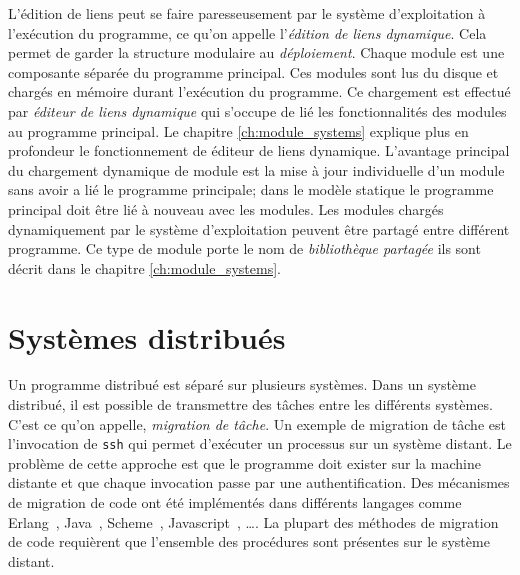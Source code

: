 L'édition de liens peut se faire paresseusement par le système d'exploitation à
l'exécution du programme, ce qu'on appelle l'\textit{édition de liens dynamique}.  Cela
permet de garder la structure modulaire au \textit{déploiement}.
Chaque module est une composante séparée du programme principal.  Ces modules
sont lus du disque et chargés en mémoire durant l'exécution du programme.  Ce
chargement est effectué par \textit{éditeur de liens dynamique} qui s'occupe de
lié les fonctionnalités des modules au programme principal. Le chapitre %
\ref{ch:module_systems} explique plus en profondeur le fonctionnement de éditeur de liens
dynamique. L'avantage principal du chargement dynamique de module est la mise à jour
individuelle d'un module sans avoir a lié le programme principale; dans le
modèle statique le programme principal doit être lié à nouveau avec les modules.
Les modules chargés dynamiquement par le système d'exploitation peuvent être partagé entre différent
programme. Ce type de module porte le nom de \textit{bibliothèque partagée} ils sont décrit dans
le chapitre \ref{ch:module_systems}.

\section{Systèmes distribués}


Un programme distribué est séparé sur plusieurs systèmes. Dans un système
distribué, il est possible de transmettre des tâches entre les différents
systèmes. C'est ce qu'on appelle, \textit{migration de tâche}.  Un exemple de
migration de tâche est l'invocation de \texttt{ssh} qui permet d'exécuter un
processus sur un système distant. Le problème de cette approche est que le
programme doit exister sur la machine distante et que chaque invocation passe
par une authentification. Des mécanismes de migration de code ont été
implémentés dans différents langages comme Erlang~\cite{M_mobileintelligent},
Java~\cite{And98transparentmigration}, Scheme~\cite{Sumii00animplementation},
Javascript~\cite{DEV2017transparentmigration}, \dots.  La plupart des méthodes
de migration de code requièrent que l'ensemble des procédures sont
présentes sur le système distant.

